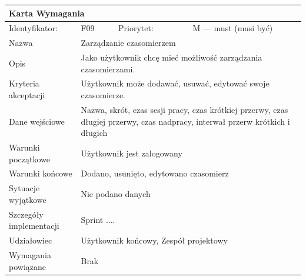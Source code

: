 \documentclass[a4paper,11pt]{report}
\begin{document}
		\begin{tabular}{|p{3cm}|p{2cm}|p{2cm}|p{6cm}|}
		\hline
		\multicolumn{4}{|p{12 cm}|}{Karta Wymagania}\\
		\hline
		Identyfikator: & F09 & Priorytet: & M — must (musi być)\\
		\hline
		Nazwa & \multicolumn{3}{|p{10 cm}|}{Zarządzanie czasomierzem}\\
		\hline
		Opis & \multicolumn{3}{|p{10 cm}|}{Jako użytkownik chcę mieć możliwość zarządzania czasomierzami.}\\
		\hline
		Kryteria akceptacji & \multicolumn{3}{|p{10 cm}|}{Użytkownik może dodawać, usuwać, edytować swoje czasomierze.}\\
		\hline
		Dane wejściowe & \multicolumn{3}{|p{10 cm}|}{Nazwa, skrót, czas sesji pracy, czas krótkiej przerwy, czas długiej przerwy, czas nadpracy, interwał przerw krótkich i długich}\\
		\hline
		Warunki początkowe & \multicolumn{3}{|p{10 cm}|}{Użytkownik jest zalogowany}\\
		\hline
		Warunki końcowe & \multicolumn{3}{|p{10 cm}|}{Dodano, usunięto, edytowano czasomierz}\\
		\hline
		Sytuacje wyjątkowe & \multicolumn{3}{|p{10 cm}|}{Nie podano danych}\\
		\hline
		Szczegóły implementacji & \multicolumn{3}{|p{10 cm}|}{Sprint ....}\\
		\hline
		Udziałowiec & \multicolumn{3}{|p{10 cm}|}{Użytkownik końcowy, Zespół projektowy}\\
		\hline
		Wymagania powiązane & \multicolumn{3}{|p{10 cm}|}{Brak}\\
		\hline
		\end{tabular}\\
		\newline
		\vspace*{0,2 cm}
		\newline
\end{document}
